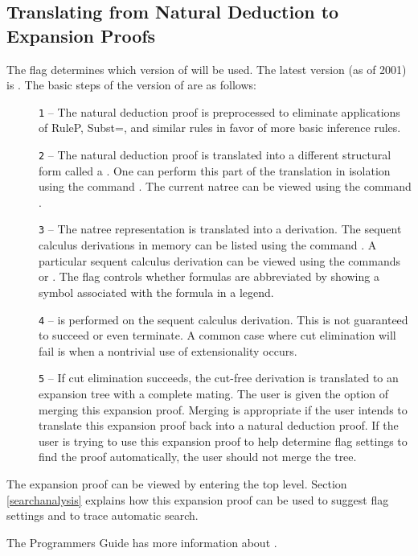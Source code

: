 \subsection{Translating from Natural Deduction to Expansion Proofs}\label{natetr}

The flag  determines which
version of  will be used.
The latest version (as of 2001) is .
The basic steps of the  version of
 are as follows:

\begin{description}
\item[] 

{\tt 1} -- The natural deduction
proof is preprocessed to eliminate applications of RuleP, Subst=,
and similar rules in favor of more basic inference rules.

{\tt 2} -- The natural deduction proof is translated into a different
structural form called a .  One can perform
this part of the translation in isolation using the command
.  The current natree can be viewed using
the command .

{\tt 3} -- The natree representation is translated into a 
derivation.  The sequent calculus derivations in memory can be listed
using the command .  A particular sequent calculus
derivation can be viewed using the commands 
or .  The flag  controls
whether formulas are abbreviated by showing a symbol associated with
the formula in a legend.

{\tt 4} --  is performed on the sequent calculus derivation.
This is not guaranteed to succeed or even terminate.  A common case
where cut elimination will fail is when a nontrivial
use of extensionality occurs.

{\tt 5} -- If cut elimination succeeds, the cut-free derivation is translated
to an expansion tree with a complete mating.  The user is given the
option of merging this expansion proof.  Merging is appropriate if
the user intends to translate this expansion proof back into a natural
deduction proof.  If the user is trying to use this expansion proof
to help determine flag settings to find the proof automatically, the
user should not merge the tree. 
\end{description}

The expansion proof can be viewed by entering the  top level.
Section \ref{searchanalysis} explains how this expansion proof can
be used to suggest flag settings and to trace automatic search.

The Programmers Guide has more information about .

